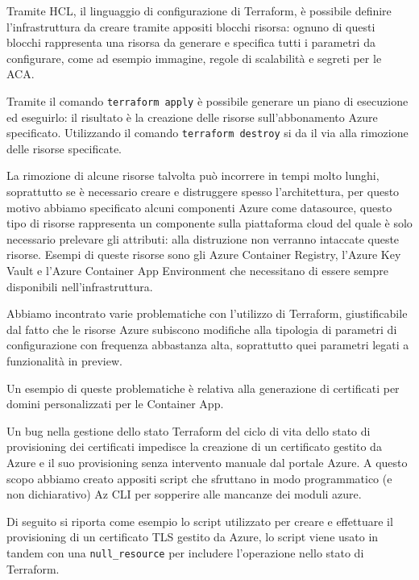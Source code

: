 Tramite HCL, il linguaggio di configurazione di Terraform, è possibile definire l'infrastruttura da creare tramite appositi blocchi risorsa: ognuno di questi blocchi rappresenta una risorsa da generare e specifica tutti i parametri da configurare, come ad esempio immagine, regole di scalabilità e segreti per le ACA.

Tramite il comando \texttt{terraform apply} è possibile generare un piano di esecuzione ed eseguirlo: il risultato è la creazione delle risorse sull'abbonamento Azure specificato. Utilizzando il comando \texttt{terraform destroy} si da il via alla rimozione delle risorse specificate.

La rimozione di alcune risorse talvolta può incorrere in tempi molto lunghi, soprattutto se è necessario creare e distruggere spesso l'architettura, per questo motivo abbiamo specificato alcuni componenti Azure come datasource, questo tipo di risorse rappresenta un componente sulla piattaforma cloud del quale è solo necessario prelevare gli attributi: alla distruzione non verranno intaccate queste risorse. Esempi di queste risorse sono gli Azure Container Registry, l'Azure Key Vault e l'Azure Container App Environment che necessitano di essere sempre disponibili nell'infrastruttura.

Abbiamo incontrato varie problematiche con l'utilizzo di Terraform, giustificabile dal fatto che le risorse Azure subiscono modifiche alla tipologia di parametri di configurazione con frequenza abbastanza alta, soprattutto quei parametri legati a funzionalità in preview.

Un esempio di queste problematiche è relativa alla generazione di certificati per domini personalizzati per le Container App.

Un bug nella gestione dello stato Terraform del ciclo di vita dello stato di provisioning dei certificati impedisce la creazione di un certificato gestito da Azure e il suo provisioning senza intervento manuale dal portale Azure. A questo scopo abbiamo creato appositi script che sfruttano in modo programmatico (e non dichiarativo) Az CLI per sopperire alle mancanze dei moduli azure.

Di seguito si riporta come esempio lo script utilizzato per creare e effettuare il provisioning di un certificato TLS gestito da Azure, lo script viene usato in tandem con una \texttt{null\_resource} per includere l'operazione nello stato di Terraform.

